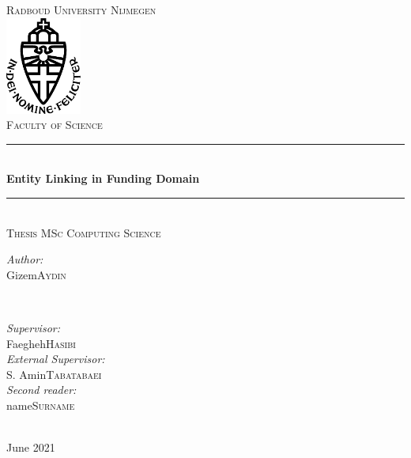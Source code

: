 \documentclass{report}
\title{\thesistitle}
\author{\thesisauthorfirst\space\thesisauthorsecond}
\date{\thesisdate}
\def\thesistitle{Entity Linking in Funding Domain}
\def\thesissubtitle{Thesis Subtitle}
\def\thesisauthorfirst{Gizem}
\def\thesisauthorsecond{Aydin}
\def\thesissupervisorfirst{Faegheh}
\def\thesissupervisorsecond{Hasibi}
\def\extthesissupervisorfirst{S. Amin}
\def\extthesissupervisorsecond{Tabatabaei}
\def\thesissecondreaderfirst{name}
\def\thesissecondreadersecond{Surname}
\def\thesisdate{June 2021}
\theoremstyle{definition}
\theoremstyle{remark}
\begin{document}
\begin{titlepage}
	\thispagestyle{empty}
	\newcommand{\HRule}{\rule{\linewidth}{0.5mm}}
	\center
	\textsc{\Large Radboud University Nijmegen}\\[.7cm]
	\includegraphics[width=25mm]{img/in_dei_nomine_feliciter.eps}\\[.5cm]
	\textsc{Faculty of Science}\\[0.5cm]
	
	\HRule \\[0.4cm]
	{ \huge \bfseries \thesistitle}\\[0.1cm]
	\HRule \\[.5cm]
	\textsc{\large Thesis MSc Computing Science}\\[.5cm]
	
	\begin{minipage}{0.4\textwidth}
	\begin{flushleft} \large
	\emph{Author:}\\
	\thesisauthorfirst\space \textsc{\thesisauthorsecond}
	\end{flushleft}
	\end{minipage}
	~
	\begin{minipage}{0.4\textwidth}
	\begin{flushright} \large
	\emph{Supervisor:} \\
	\thesissupervisorfirst\space \textsc{\thesissupervisorsecond} \\[1em]
	\emph{External Supervisor:} \\
	\extthesissupervisorfirst\space \textsc{\extthesissupervisorsecond} \\[1em]
	\emph{Second reader:} \\
	\thesissecondreaderfirst\space \textsc{\thesissecondreadersecond}
	\end{flushright}
	\end{minipage}\\[4cm]
	\vfill
	{\large \thesisdate}\\
	\clearpage
\end{titlepage}
\end{document}
